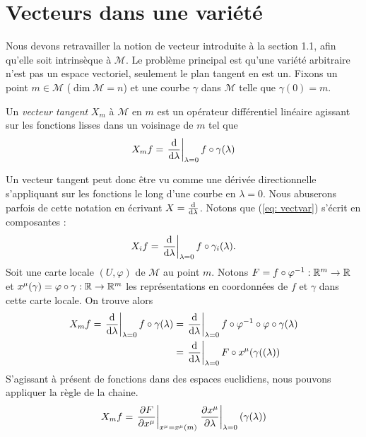 \section{Vecteurs dans une variété}
Nous devons retravailler la notion de vecteur introduite à la section 1.1, afin qu'elle soit intrinsèque à $\mathcal{M}$. Le problème principal est qu'une variété arbitraire n'est pas un espace vectoriel, seulement le plan tangent en est un. Fixons un point $m\in \mathcal{M}$ ($\dim \mathcal{M} = n$) et une courbe $\gamma$ dans $\mathcal{M}$ telle que $\gamma(0)=m$.
\begin{theoremframe}
    \begin{defi}
        Un \emph{vecteur tangent} $X_m$ à $\mathcal{M}$ en $m$ est un opérateur différentiel linéaire agissant sur les fonctions lisses dans un voisinage de $m$ tel que
        \begin{equation}
        \label{eq: vectvar}
            X_m f =\left. \frac{\mathrm{d}}{\mathrm{d} \lambda}\right|_{\lambda=0}  f \circ \gamma(\lambda)
        \end{equation}
    \end{defi}
\end{theoremframe}
Un vecteur tangent peut donc être vu comme une dérivée directionnelle s'appliquant sur les fonctions le long d'une courbe en $\lambda=0$. Nous abuserons parfois de cette notation en écrivant $X = \frac{\mathrm{d}}{\mathrm{d} \lambda}$. Notons que (\ref{eq: vectvar}) s'écrit en composantes :
\begin{equation}
    X_i f = \left. \frac{\mathrm{d}}{\mathrm{d} \lambda}\right|_{\lambda=0}  f \circ \gamma_i(\lambda).
\end{equation}
Soit une carte locale $(U,\varphi)$ de $\mathcal{M}$ au point $m$. Notons $F = f \circ \varphi^{-1} : \mathbb{R}^m\to \mathbb{R}$ et $x^\mu(\gamma) = \varphi \circ \gamma: \mathbb{R} \to \mathbb{R}^m$ les représentations en coordonnées de $f$ et $\gamma$ dans cette carte locale. On trouve alors
\begin{align}
    X_m f = \left. \frac{\mathrm{d}}{\mathrm{d} \lambda}\right|_{\lambda=0}  f \circ \gamma(\lambda) &= \left. \frac{\mathrm{d}}{\mathrm{d} \lambda}\right|_{\lambda=0}  f \circ \varphi^{-1} \circ \varphi \circ \gamma(\lambda)\\
    & = \left. \frac{\mathrm{d}}{\mathrm{d} \lambda}\right|_{\lambda=0}  F \circ x^\mu(\gamma((\lambda))
\end{align}
S'agissant à présent de fonctions dans des espaces euclidiens, nous pouvons appliquer la règle de la chaine.
\begin{align}
    X_mf = \left. \frac{\partial F}{\partial x^\mu} \right|_{x^\mu=x^\mu(m)} \left. \frac{\partial x^\mu}{\partial \lambda} \right|_{\lambda = 0} (\gamma(\lambda))
\end{align}
